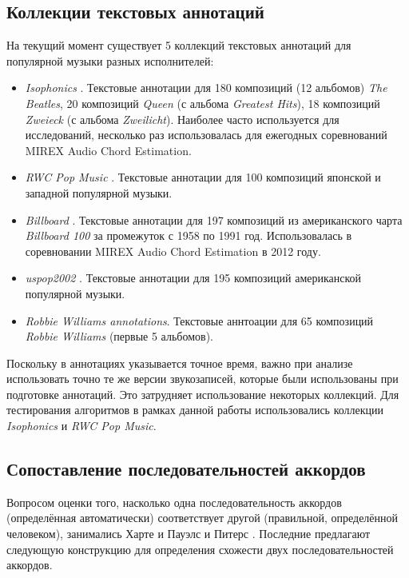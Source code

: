 \subsection{Коллекции текстовых аннотаций} \label{ssect3_coll}

На текущий момент существует 5 коллекций текстовых аннотаций для популярной
музыки разных исполнителей:
\begin{itemize}
  \item \emph{Isophonics} \cite{MauchOmp2009}. Текстовые аннотации для 180
  композиций (12 альбомов) \textit{The Beatles}, 20 композиций \textit{Queen}
  (с альбома \textit{Greatest Hits}), 18 композиций \textit{Zweieck} (с альбома
  \textit{Zweilicht}). Наиболее часто используется для исследований, несколько
  раз использовалась для ежегодных соревнований MIREX Audio Chord Estimation.
  
  \item \emph{RWC Pop Music} \cite{Goto2002}. Текстовые аннотации для 100
  композиций японской и западной популярной музыки.
  
  \item \emph{Billboard} \cite{Burgoyne2011}. Текстовые аннотации для 197
  композиций из американского чарта \textit{Billboard 100} за промежуток с 1958
  по 1991 год. Использовалась в соревновании MIREX Audio Chord Estimation в 2012
  году.
  
  \item \emph{uspop2002} \cite{Berenzweig2004}. Текстовые аннотации для 195
  композиций американской популярной музыки.
  
  \item \emph{Robbie Williams annotations}. Текстовые аннтоации для 65
  композиций \textit{Robbie Williams} (первые 5 альбомов).
\end{itemize}

Поскольку в аннотациях указывается точное время, важно при анализе использовать
точно те же версии звукозаписей, которые были использованы при подготовке
аннотаций. Это затрудняет использование некоторых коллекций. Для тестирования
алгоритмов в рамках данной работы использовались коллекции \emph{Isophonics} и
\emph{RWC Pop Music}.

\subsection{Сопоставление последовательностей аккордов}

Вопросом оценки того, насколько одна последовательность аккордов (определённая
автоматически) соответствует другой (правильной, определённой человеком),
занимались Харте \cite{Harte2010} и Пауэлс и Питерс \cite{Pauwels2013}.
Последние предлагают следующую конструкцию для определения схожести двух
последовательностей аккордов.

